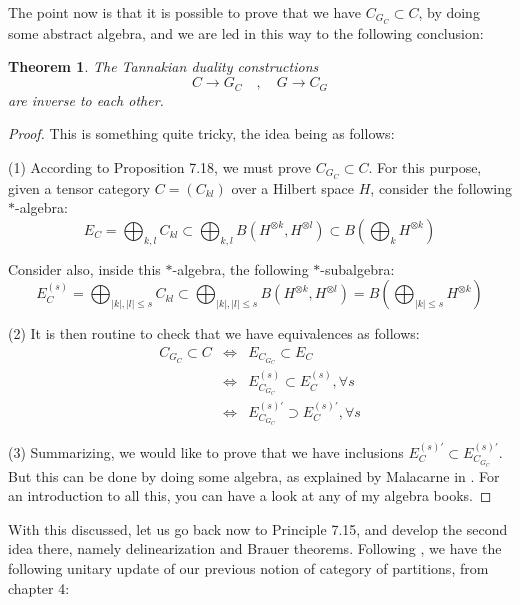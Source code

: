 \documentclass[12pt]{amsbook}
\newtheorem{theorem}{Theorem}[chapter]
\begin{document}
The point now is that it is possible to prove that we have $C_{G_C}\subset C$, by doing some abstract algebra, and we are led in this way to the following conclusion:

\begin{theorem}
The Tannakian duality constructions 
$$C\to G_C\quad,\quad 
G\to C_G$$
are inverse to each other.
\end{theorem}

\begin{proof}
This is something quite tricky, the idea being as follows:

\medskip

(1) According to Proposition 7.18, we must prove $C_{G_C}\subset C$. For this purpose, given a tensor category $C=(C_{kl})$ over a Hilbert space $H$, consider the following $*$-algebra:
$$E_C
=\bigoplus_{k,l}C_{kl}
\subset\bigoplus_{k,l}B(H^{\otimes k},H^{\otimes l})
\subset B\left(\bigoplus_kH^{\otimes k}\right)$$

Consider also, inside this $*$-algebra, the following $*$-subalgebra:
$$E_C^{(s)}
=\bigoplus_{|k|,|l|\leq s}C_{kl}
\subset\bigoplus_{|k|,|l|\leq s}B(H^{\otimes k},H^{\otimes l})
=B\left(\bigoplus_{|k|\leq s}H^{\otimes k}\right)$$

(2) It is then routine to check that we have equivalences as follows:
\begin{eqnarray*}
C_{G_C}\subset C
&\iff&E_{C_{G_C}}\subset E_C\\
&\iff&E_{C_{G_C}}^{(s)}\subset E_C^{(s)},\forall s\\
&\iff&E_{C_{G_C}}^{(s)'}\supset E_C^{(s)'},\forall s
\end{eqnarray*}

(3) Summarizing, we would like to prove that we have inclusions $E_C^{(s)'}\subset E_{C_{G_C}}^{(s)'}$. But this can be done by doing some algebra, as explained by Malacarne in \cite{mal}. For an introduction to all this, you can have a look at any of my algebra books.
\end{proof}

With this discussed, let us go back now to Principle 7.15, and develop the second idea there, namely delinearization and Brauer theorems. Following \cite{bsp}, we have the following unitary update of our previous notion of category of partitions, from chapter 4:
\end{document}
